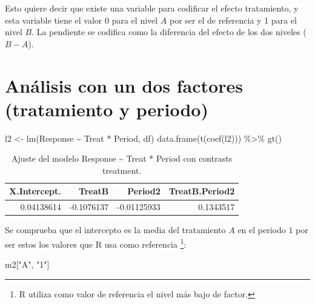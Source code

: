 \documentclass[
  12pt,
  a4paper,
  extrafontsizes,
  onecolumn,
  openright,
  table]{memoir}
\newenvironment{Shaded}{\begin{snugshade}}{\end{snugshade}}
\newcommand{\FunctionTok}[1]{\textcolor[rgb]{0.28,0.35,0.67}{#1}}
\newcommand{\NormalTok}[1]{\textcolor[rgb]{0.00,0.23,0.31}{#1}}
\newcommand{\OtherTok}[1]{\textcolor[rgb]{0.00,0.23,0.31}{#1}}
\newcommand{\SpecialCharTok}[1]{\textcolor[rgb]{0.37,0.37,0.37}{#1}}
\newcommand{\StringTok}[1]{\textcolor[rgb]{0.13,0.47,0.30}{#1}}
\begin{document}
Esto quiere decir que existe una variable para codificar el efecto
tratamiento, y esta variable tiene el valor 0 para el nivel \(A\) por
ser el de referencia y 1 para el nivel \(B\). La pendiente se codifica
como la diferencia del efecto de los dos niveles (\(B - A\)).

\hypertarget{anuxe1lisis-con-un-dos-factores-tratamiento-y-periodo}{%
\section{Análisis con un dos factores (tratamiento y
periodo)}\label{anuxe1lisis-con-un-dos-factores-tratamiento-y-periodo}}

\scriptsize

\begin{Shaded}
\begin{Highlighting}[]
\NormalTok{l2 }\OtherTok{\textless{}{-}} \FunctionTok{lm}\NormalTok{(Response }\SpecialCharTok{\textasciitilde{}}\NormalTok{ Treat }\SpecialCharTok{*}\NormalTok{ Period, df)}
\FunctionTok{data.frame}\NormalTok{(}\FunctionTok{t}\NormalTok{(}\FunctionTok{coef}\NormalTok{(l2))) }\SpecialCharTok{\%\textgreater{}\%} \FunctionTok{gt}\NormalTok{()}
\end{Highlighting}
\end{Shaded}

\hypertarget{tbl-l2}{}
\begin{longtable}{rrrr}
\caption{\label{tbl-l2}Ajuste del modelo Response \textasciitilde{} Treat * Period con
contrasts treatment. }\tabularnewline

\toprule
X.Intercept. & TreatB & Period2 & TreatB.Period2 \\ 
\midrule
0.04138614 & -0.1076137 & -0.01125933 & 0.1343517 \\ 
\bottomrule
\end{longtable}

\normalsize

Se comprueba que el intercepto es la media del tratamiento \(A\) en el
periodo \(1\) por ser estos los valores que R usa como referencia
\footnote{R utiliza como valor de referencia el nivel más bajo de
  factor.}:

\scriptsize

\begin{Shaded}
\begin{Highlighting}[]
\NormalTok{m2[}\StringTok{"A"}\NormalTok{, }\StringTok{"1"}\NormalTok{]}
\end{Highlighting}
\end{Shaded}
\end{document}
